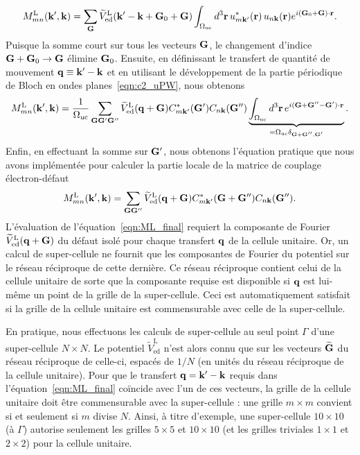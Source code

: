 \begin{equation}
    M^\text{L}_{mn}(\mathbf{k}',\mathbf{k}) = \sum_{\mathbf{G}}\widetilde{V}_\text{ed}^\text{L}(\mathbf{k}'-\mathbf{k}+ \mathbf{G}_0 + \mathbf{G})\int_{\Omega_\text{uc}} d^3\mathbf{r}\,u_{m\mathbf{k}'}^*(\mathbf{r})\,u_{n\mathbf{k}}(\mathbf{r})e^{i(\mathbf{G}_0 + \mathbf{G})\cdot\mathbf{r}}.
\end{equation}
Puisque la somme court sur tous les vecteurs $\mathbf{G}$, le changement d'indice $\mathbf{G}+\mathbf{G}_0\to\mathbf{G}$ élimine $\mathbf{G}_0$. Ensuite, en définissant le transfert de quantité de mouvement $\mathbf{q}\equiv\mathbf{k}'-\mathbf{k}$ et en utilisant le développement de la partie périodique de Bloch en ondes planes~\eqref{eqn:c2_uPW}, nous obtenons
\begin{equation}
     M^\text{L}_{mn}(\mathbf{k}',\mathbf{k}) = \frac{1}{\Omega_\text{uc}}\sum_{\mathbf{G}\mathbf{G}'\mathbf{G}''}\widetilde{V}_\text{ed}^\text{L}(\mathbf{q}+\mathbf{G})C_{m\mathbf{k}'}^*(\mathbf{G}')C_{n\mathbf{k}}(\mathbf{G}'')\underbrace{\int_{\Omega_\text{uc}} d^3\mathbf{r}\,e^{i(\mathbf{G}+\mathbf{G}''-\mathbf{G}')\cdot\mathbf{r}}}_{=\Omega_\text{uc}\delta_{\mathbf{G}+\mathbf{G}'',\mathbf{G}'}}.
\end{equation}
Enfin, en effectuant la somme sur $\mathbf{G}'$, nous obtenons l'équation pratique que nous avons implémentée pour calculer la partie locale de la matrice de couplage électron-défaut
\begin{equation}
    M_{mn}^\text{L}(\mathbf{k}',\mathbf{k}) = \sum_{\mathbf{G}\mathbf{G}''}\widetilde{V}_\text{ed}^\text{L}(\mathbf{q}+\mathbf{G})C_{m\mathbf{k}'}^*(\mathbf{G}+\mathbf{G}'')C_{n\mathbf{k}}(\mathbf{G}'').\label{eqn:ML_final}
\end{equation}
L'évaluation de l'équation~\eqref{eqn:ML_final} requiert la composante de Fourier $\widetilde{V}_\text{ed}^\text{L}(\mathbf{q}+\mathbf{G})$ du défaut isolé pour chaque transfert $\mathbf{q}$ de la cellule unitaire. Or, un calcul de super-cellule ne fournit que les composantes de Fourier du potentiel sur le réseau réciproque de cette dernière. Ce réseau réciproque contient celui de la cellule unitaire de sorte que la composante requise est disponible si $\mathbf{q}$ est lui-même un point de la grille de la super-cellule. Ceci est automatiquement satisfait si la grille de la cellule unitaire est commensurable avec celle de la super-cellule.

En pratique, nous effectuons les calculs de super-cellule au seul point $\Gamma$ d'une super-cellule $N\times N$. Le potentiel $\widetilde{V}_\text{ed}^\text{L}$ n'est alors connu que sur les vecteurs $\widetilde{\mathbf{G}}$ du réseau réciproque de celle-ci, espacés de $1/N$ (en unités du réseau réciproque de la cellule unitaire). Pour que le transfert $\mathbf{q}=\mathbf{k}'-\mathbf{k}$ requis dans l'équation~\eqref{eqn:ML_final} coïncide avec l'un de ces vecteurs, la grille de la cellule unitaire doit être commensurable avec la super-cellule : une grille $m\times m$ convient si et seulement si $m$ divise $N$. Ainsi, à titre d'exemple, une super-cellule $10\times 10$ (à $\Gamma$) autorise seulement les grilles $5\times 5$ et $10\times 10$ (et les grilles triviales $1\times 1$ et $2\times 2$) pour la cellule unitaire.

